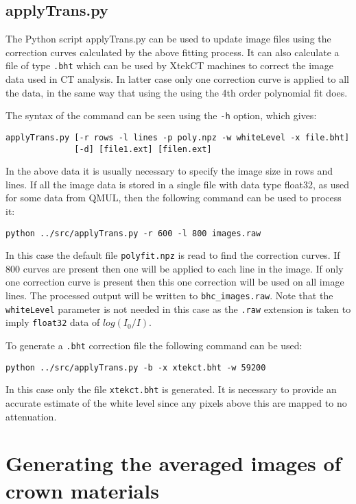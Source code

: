 \documentclass[a4paper,12pt]{article}
\begin{document}
\subsection{applyTrans.py}

The Python script applyTrans.py can be used to update image files using the correction curves calculated by
the above fitting process.
It can also calculate a file of type \texttt{.bht} which can be used by XtekCT machines to correct the image
data used in CT analysis. In latter case only one correction curve is applied to all the data, in the same
way that using the using the 4th order polynomial fit does.

The syntax of the command can be seen using the \texttt{-h} option, which gives:
\begin{verbatim}
applyTrans.py [-r rows -l lines -p poly.npz -w whiteLevel -x file.bht]
              [-d] [file1.ext] [filen.ext]
\end{verbatim}
In the above data it is usually necessary to specify the image size in rows and lines.
If all the image data is stored in a single file with data type float32, as used for
some data from QMUL, then the following command can be used to process it:

\begin{verbatim}
python ../src/applyTrans.py -r 600 -l 800 images.raw
\end{verbatim}
In this case the default file \texttt{polyfit.npz} is read to find the correction curves.
If 800 curves are present then one will be applied to each line in the image.
If only one correction curve is present then this one correction will be used on all image lines.
The processed output will be written to \texttt{bhc\_images.raw}.
Note that the \texttt{whiteLevel} parameter is not needed in this case as the \texttt{.raw} extension
is taken to imply \texttt{float32} data of $log(I_0/I)$.

To generate a \texttt{.bht} correction file the following command can be used:
\begin{verbatim}
python ../src/applyTrans.py -b -x xtekct.bht -w 59200
\end{verbatim}
In this case only the file \texttt{xtekct.bht} is generated. It is necessary to provide an accurate estimate
of the white level since any pixels above this are mapped to no attenuation.

\appendix

\section{Generating the averaged images of crown materials}
\end{document}
